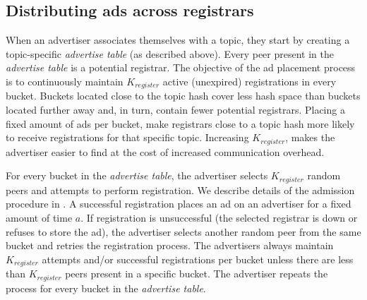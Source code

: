 \subsection{Distributing ads across registrars}\label{sec:registration_multi}
When an advertiser associates themselves with a topic, they start by creating a topic-specific \emph{advertise table} (as described above). 
Every peer present in the \emph{advertise table} is a potential registrar. 
The objective of the ad placement process is to continuously maintain $K_\textit{register}$ active (\ie unexpired) registrations in every bucket. 
Buckets located close to the topic hash cover less hash space than buckets located further away and, in turn, contain fewer potential registrars. 
Placing a fixed amount of ads per bucket, make registrars close to a topic hash more likely to receive registrations for that specific topic. 
Increasing $K_\textit{register}$, makes the advertiser easier to find at the cost of increased communication overhead. %


For every bucket in the \emph{advertise table}, the advertiser selects
$K_{register}$ random peers and attempts to perform registration.
We describe details of the admission procedure in . 
A successful registration places an ad on an advertiser for a fixed amount of time $a$.
If registration is unsuccessful (the selected registrar is down or refuses to store the ad), the advertiser selects another random peer from the same bucket and retries the registration process. 
The advertisers always maintain $K_\textit{register}$ attempts and/or
successful registrations per bucket unless there are less than $K_\textit{register}$ peers present in a specific bucket.
The advertiser repeats the process for every bucket in the \emph{advertise table}. 

